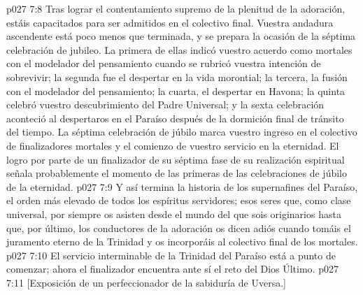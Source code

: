 \vs p027 7:8 \pc Tras lograr el contentamiento supremo de la plenitud de la adoración, estáis capacitados para ser admitidos en el colectivo final. Vuestra andadura ascendente está poco menos que terminada, y se prepara la ocasión de la séptima celebración de jubileo. La primera de ellas indicó vuestro acuerdo como mortales con el modelador del pensamiento cuando se rubricó vuestra intención de sobrevivir; la segunda fue el despertar en la vida morontial; la tercera, la fusión con el modelador del pensamiento; la cuarta, el despertar en Havona; la quinta celebró vuestro descubrimiento del Padre Universal; y la sexta celebración aconteció al despertaros en el Paraíso después de la dormición final de tránsito del tiempo. La séptima celebración de júbilo marca vuestro ingreso en el colectivo de finalizadores mortales y el comienzo de vuestro servicio en la eternidad. El logro por parte de un finalizador de su séptima fase de su realización espiritual señala probablemente el momento de las primeras de las celebraciones de júbilo de la eternidad.
\vs p027 7:9 \pc Y así termina la historia de los supernafines del Paraíso, el orden más elevado de todos los espíritus servidores; esos seres que, como clase universal, por siempre os asisten desde el mundo del que sois originarios hasta que, por último, los conductores de la adoración os dicen adiós cuando tomáis el juramento eterno de la Trinidad y os incorporáis al colectivo final de los mortales.
\vs p027 7:10 El servicio interminable de la Trinidad del Paraíso está a punto de comenzar; ahora el finalizador encuentra ante sí el reto del Dios Último.
\vsetoff
\vs p027 7:11 [Exposición de un perfeccionador de la sabiduría de Uversa.]
